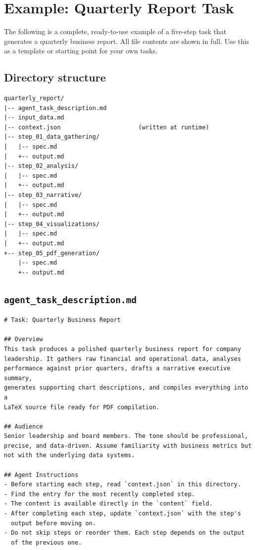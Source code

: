 \documentclass[12pt, a4paper]{article}
\begin{document}
\clearpage
\section{Example: Quarterly Report Task}
\label{appendix:example}

The following is a complete, ready-to-use example of a five-step task that generates a quarterly business report. All file contents are shown in full. Use this as a template or starting point for your own tasks.

\subsection{Directory structure}

\begin{lstlisting}
quarterly_report/
|-- agent_task_description.md
|-- input_data.md
|-- context.json                      (written at runtime)
|-- step_01_data_gathering/
|   |-- spec.md
|   +-- output.md
|-- step_02_analysis/
|   |-- spec.md
|   +-- output.md
|-- step_03_narrative/
|   |-- spec.md
|   +-- output.md
|-- step_04_visualizations/
|   |-- spec.md
|   +-- output.md
+-- step_05_pdf_generation/
    |-- spec.md
    +-- output.md
\end{lstlisting}

\subsection{\texttt{agent\_task\_description.md}}

\begin{lstlisting}[language={}]
# Task: Quarterly Business Report

## Overview
This task produces a polished quarterly business report for company
leadership. It gathers raw financial and operational data, analyses
performance against prior quarters, drafts a narrative executive summary,
generates supporting chart descriptions, and compiles everything into a
LaTeX source file ready for PDF compilation.

## Audience
Senior leadership and board members. The tone should be professional,
precise, and data-driven. Assume familiarity with business metrics but
not with the underlying data systems.

## Agent Instructions
- Before starting each step, read `context.json` in this directory.
- Find the entry for the most recently completed step.
- The content is available directly in the `content` field.
- After completing each step, update `context.json` with the step's
  output before moving on.
- Do not skip steps or reorder them. Each step depends on the output
  of the previous one.
\end{lstlisting}
\end{document}
